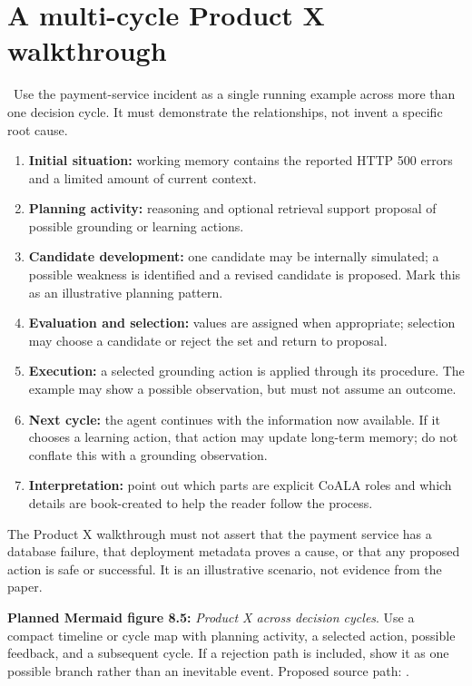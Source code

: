 \section{A multi-cycle Product X walkthrough}
\BookExampleLabel\ Use the payment-service incident as a single running example across more than one decision cycle. It must demonstrate the relationships, not invent a specific root cause.
\begin{enumerate}
  \item \textbf{Initial situation:} working memory contains the reported HTTP 500 errors and a limited amount of current context.
  \item \textbf{Planning activity:} reasoning and optional retrieval support proposal of possible grounding or learning actions.
  \item \textbf{Candidate development:} one candidate may be internally simulated; a possible weakness is identified and a revised candidate is proposed. Mark this as an illustrative planning pattern.
  \item \textbf{Evaluation and selection:} values are assigned when appropriate; selection may choose a candidate or reject the set and return to proposal.
  \item \textbf{Execution:} a selected grounding action is applied through its procedure. The example may show a possible observation, but must not assume an outcome.
  \item \textbf{Next cycle:} the agent continues with the information now available. If it chooses a learning action, that action may update long-term memory; do not conflate this with a grounding observation.
  \item \textbf{Interpretation:} point out which parts are explicit CoALA roles and which details are book-created to help the reader follow the process.
\end{enumerate}
\begin{warningbox}
The Product X walkthrough must not assert that the payment service has a database failure, that deployment metadata proves a cause, or that any proposed action is safe or successful. It is an illustrative scenario, not evidence from the paper.
\end{warningbox}
\textbf{Planned Mermaid figure 8.5:} \emph{Product X across decision cycles}. Use a compact timeline or cycle map with planning activity, a selected action, possible feedback, and a subsequent cycle. If a rejection path is included, show it as one possible branch rather than an inevitable event. Proposed source path: .

